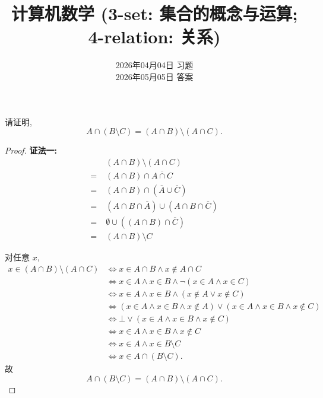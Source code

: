 \documentclass[a4paper, justified]{tufte-handout}
\title{计算机数学 (3-set: 集合的概念与运算; 4-relation: 关系)}
\date{2026年04月04日 \quad 习题\\2026年05月05日 \quad 答案}
\begin{document}
\maketitle
\noplagiarism %
\begin{abstract}
\end{abstract}
\beginrequired

\begin{problem}[相对补与绝对补]
  请证明,
  \[
    A \cap (B \setminus C) = (A \cap B) \setminus (A \cap C).
  \]
\end{problem}

\begin{proof}
  {\bf 证法一:}
  \begin{align*}
    &(A \cap B) \setminus (A \cap C) \\
    =\; & (A \cap B) \cap \overline{A \cap C} \\
    =\; & (A \cap B) \cap (\overline{A} \cup \overline{C}) \\
    =\; & (A \cap B \cap \overline{A}) \cup (A \cap B \cap \overline{C}) \\
    =\; & \emptyset \cup ((A \cap B) \cap \overline{C}) \\
    =\; & (A \cap B) \setminus C
  \end{align*}


  对任意 $x$,
  \begin{align*}
    x \in (A \cap B) \setminus (A \cap C)
      &\iff x \in A \cap B \land x \notin A \cap C \\
      &\iff x \in A \land x \in B \land \lnot (x \in A \land x \in C) \\
      &\iff x \in A \land x \in B \land (x \notin A \lor x \notin C) \\
      &\iff (x \in A \land x \in B \land x \notin A) \lor (x \in A \land x \in B \land x \notin C) \\
      &\iff \bot \lor (x \in A \land x \in B \land x \notin C) \\
      &\iff x \in A \land x \in B \land x \notin C \\
      &\iff x \in A \land x \in B \setminus C \\
      &\iff x \in A \cap (B \setminus C).
  \end{align*}
  故
  \[
    A \cap (B \setminus C) = (A \cap B) \setminus (A \cap C).
  \]
\end{proof}
\end{document}
